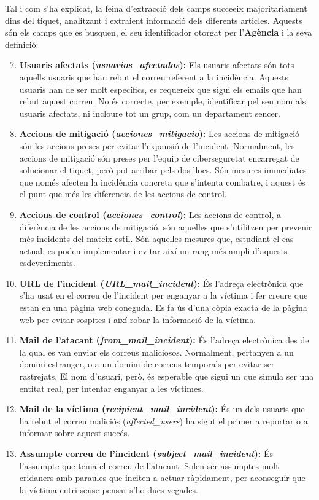 Tal i com s'ha explicat, la feina d'extracció dels camps succeeix majoritariament dins del tiquet, analitzant i extraient informació dels diferents articles. Aquests són els camps que es busquen, el seu identificador otorgat per l'\textbf{Agència} i la seva definició: 
\begin{enumerate}
  \setcounter{enumi}{6}
  \item \textbf{Usuaris afectats (\textit{usuarios\_afectados}):} Els usuaris afectats són tots aquells usuaris que han rebut el correu referent a la incidència. Aquests usuaris han de ser molt específics, es requereix que sigui els emails que han rebut aquest correu. No és correcte, per exemple, identificar pel seu nom als usuaris afectats, ni incloure tot un grup, com un departament sencer.
  \item \textbf{Accions de mitigació (\textit{acciones\_mitigacio}):} Les accions de mitigació són les accions preses per evitar l'expansió de l'incident. Normalment, les accions de mitigació són preses per l'equip de ciberseguretat encarregat de solucionar el tiquet, però pot arribar pels dos llocs. Són mesures immediates que només afecten la incidència concreta que s'intenta combatre, i aquest és el punt que més les diferencia de les accions de control.
  \item \textbf{Accions de control (\textit{acciones\_control}):} Les accions de control, a diferència de les accions de mitigació, són aquelles que s'utilitzen per prevenir més incidents del mateix estil. Són aquelles mesures que, estudiant el cas actual, es poden implementar i evitar així un rang més ampli d'aquests esdeveniments.
  \item \textbf{URL de l'incident (\textit{URL\_mail\_incident}):} És l'adreça electrònica que s'ha usat en el correu de l'incident per enganyar a la víctima i fer creure que estan en una pàgina web coneguda. Es fa ús d'una còpia exacta de la pàgina web per evitar sospites i així robar la informació de la víctima.
  \item \textbf{Mail de l'atacant (\textit{from\_mail\_incident}):} És l'adreça electrònica des de la qual es van enviar els correus maliciosos. Normalment, pertanyen a un domini estranger, o a un domini de correus temporals per evitar ser rastrejats. El nom d'usuari, però, és esperable que sigui un que simula ser una entitat real, per intentar enganyar a les víctimes.
  \item \textbf{Mail de la víctima (\textit{recipient\_mail\_incident}):} És un dels usuaris que ha rebut el correu maliciós (\textit{affected\_users}) ha sigut el primer a reportar o a informar sobre aquest succés.
  \item \textbf{Assumpte correu de l'incident (\textit{subject\_mail\_incident}):} És l'assumpte que tenia el correu de l'atacant. Solen ser assumptes molt cridaners amb paraules que inciten a actuar ràpidament, per aconseguir que la víctima entri sense pensar-s'ho dues vegades.
\end{enumerate}

